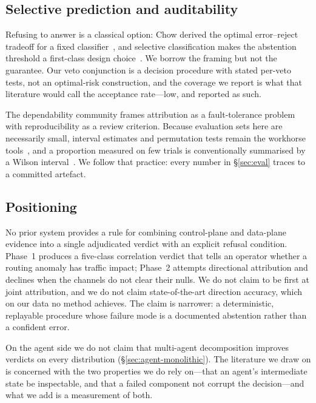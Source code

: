 \subsection{Selective prediction and auditability}

Refusing to answer is a classical option: Chow derived the optimal
error--reject tradeoff for a fixed classifier~\cite{chow-1970-rejection},
and selective classification makes the abstention threshold a
first-class design choice~\cite{geifman-2017-selective}. We borrow the
framing but not the guarantee. Our veto conjunction is a decision
procedure with stated per-veto tests, not an optimal-risk construction,
and the coverage we report is what that literature would call the
acceptance rate---low, and reported as such.

The dependability community frames attribution as a fault-tolerance
problem with reproducibility as a review criterion. Because evaluation
sets here are necessarily small, interval estimates and permutation
tests remain the workhorse tools~\cite{phipson-2010-permutation,efron-1979-bootstrap},
and a proportion measured on few trials is conventionally summarised by a
Wilson interval~\cite{wilson-1927}. We follow that practice: every number
in \S\ref{sec:eval} traces to a committed artefact.

\subsection{Positioning}

No prior system provides a rule for combining control-plane and
data-plane evidence into a single adjudicated verdict with an explicit
refusal condition. Phase~1 produces a five-class correlation verdict
that tells an operator whether a routing anomaly has traffic impact;
Phase~2 attempts directional attribution and declines when the channels
do not clear their nulls. We do not claim to be first at joint
attribution, and we do not claim state-of-the-art direction accuracy,
which on our data no method achieves. The claim is narrower: a
deterministic, replayable procedure whose failure mode is a documented
abstention rather than a confident error.

On the agent side we do not claim that multi-agent decomposition improves
verdicts on every distribution (\S\ref{sec:agent-monolithic}). The
literature we draw on is concerned with the two properties we do rely
on---that an agent's intermediate state be inspectable, and that a failed
component not corrupt the decision---and what we add is a measurement of
both.
